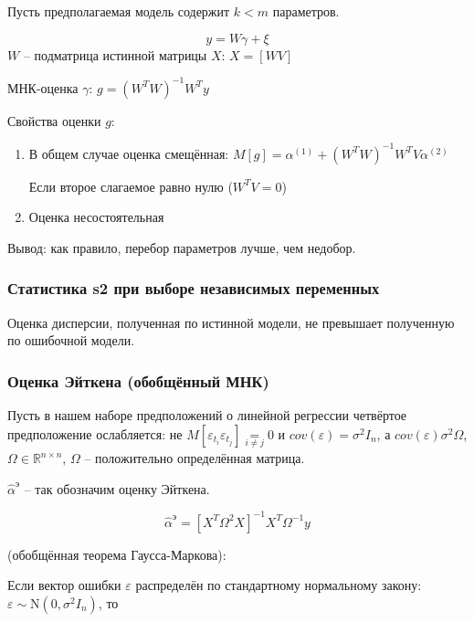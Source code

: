 \documentclass[main.tex]{subfiles}
\begin{document}
Пусть предполагаемая модель содержит $ k < m $ параметров.

\[  y = W \gamma + \xi  \]
$ W $ -- подматрица истинной матрицы  $ X $: $ X = [W V] $

МНК-оценка $ \gamma $: $ g = (W^T W)^{-1} W^T y $

Свойства оценки $ g $:

\begin{enumerate}[noitemsep]
    \item В общем случае оценка смещённая: $ M[g] = \alpha^{(1)} + (W^T W)^{-1} W^T V \alpha^{(2)} $

    Если второе слагаемое равно нулю ($ W^T V = 0 $)

    \item Оценка несостоятельная
\end{enumerate}

Вывод: как правило, перебор параметров лучше, чем недобор.

\subsubsection{ Статистика s2 при выборе независимых переменных }

Оценка дисперсии, полученная по истинной модели, не превышает полученную по ошибочной модели.

\subsubsection{ Оценка Эйткена (обобщённый МНК) }

Пусть в нашем наборе предположений о линейной регрессии четвёртое предположение ослабляется: не $ M[ \varepsilon_{t_i} \varepsilon_{t_j} ] \underset{i \ne j}= 0 $ и $ cov(\varepsilon) = \sigma^2 I_n $,
а $ cov(\varepsilon) \sigma^2 \Omega $, $ \Omega \in \mathds{R}^{n \times n} $, $ \Omega $ -- положительно определённая матрица.

$ \hat \alpha^{\text{э}} $ -- так обозначим оценку Эйткена.

\[ \hat \alpha^{\text{э}} = [ X^T \Omega^2 X ]^{-1} X^T \Omega^{-1} y \]

\begin{theorem}
    (обобщённая теорема Гаусса-Маркова): %
\end{theorem}

\begin{theorem}
    Если вектор ошибки $ \varepsilon $ распределён по стандартному нормальному закону: $ \varepsilon \sim \mathrm{N}(0, \sigma^2 I_n) $, то %
\end{theorem}
\end{document}
